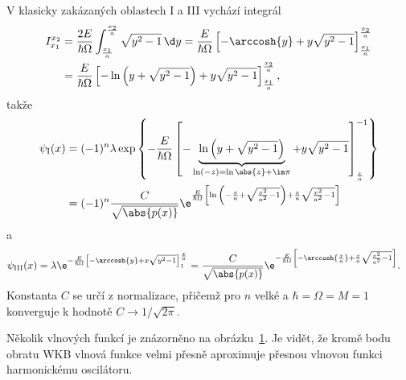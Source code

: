 \begin{solution}
	V klasicky zakázaných oblastech I a III vychází integrál
	\begin{align}
		I_{x_{1}}^{x_{2}}
			&=\frac{2E}{\hbar\Omega}\int_{\frac{x_{1}}{a}}^{\frac{x_{2}}{a}}\sqrt{y^{2}-1}\,\d y
			 =\frac{E}{\hbar\Omega}\left[-\arccosh{y}+y\sqrt{y^{2}-1}\right]_{\frac{x_{1}}{a}}^{\frac{x_{2}}{a}}\nonumber\\
			&=\frac{E}{\hbar\Omega}\left[-\ln{\left(y+\sqrt{y^{2}-1}\right)}+y\sqrt{y^{2}-1}\right]_{\frac{x_{1}}{a}}^{\frac{x_{2}}{a}},
	\end{align}
	takže	
	\begin{align}
		\psi_{\mathrm{I}}(x)
			&=(-1)^{n}\lambda\exp\left\{-\frac{E}{\hbar\Omega}\left[-\underbrace{\ln{\left(y+\sqrt{y^{2}-1}\right)}}_{\ln(-z)=\ln{\abs{z}}+\im\pi}+y\sqrt{y^{2}-1}\right]_{\frac{x}{a}}^{-1}\right\}\nonumber\\
			&=(-1)^{n}\frac{C}{\sqrt{\abs{p(x)}}}\e^{\frac{E}{\hbar\Omega}\left[\ln{\left(-\frac{x}{a}+\sqrt{\frac{x^{2}}{a^{2}}-1}\right)}+\frac{x}{a}\sqrt{\frac{x^{2}}{a^{2}}-1}\right]}
	\end{align}
	a
	\begin{align}
		\psi_{\mathrm{III}}(x)
			&=\lambda\e^{-\frac{E}{\hbar\Omega}\left[-\arccosh{y}+x\sqrt{y^{2}-1}\right]_{1}^{\frac{x}{a}}}
			 =\frac{C}{\sqrt{\abs{p(x)}}}\e^{-\frac{E}{\hbar\Omega}\left[-\arccosh{\frac{x}{a}}+\frac{x}{a}\sqrt{\frac{x^{2}}{a^{2}}-1}\right]}.
	\end{align}
	Konstanta $C$ se určí z normalizace, přičemž pro $n$ velké a $\hbar=\Omega=M=1$ konverguje k hodnotě $C\rightarrow1/\sqrt{2\pi}$.
	
	\begin{figure}[!htbp]
		\centering
		\label{fig:howf}
	\end{figure}	
	
	Několik vlnových funkcí je znázorněno na obrázku~\ref{fig:howf}.
	Je vidět, že kromě bodu obratu WKB vlnová funkce velmi přesně aproximuje přesnou vlnovou funkci harmonickému oscilátoru.
\end{solution}